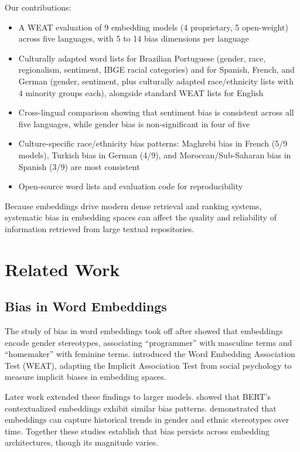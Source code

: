 \documentclass{sbc2019}
\begin{document}
Our contributions:
\begin{itemize}[nosep]
    \item A WEAT evaluation of 9 embedding models (4 proprietary, 5 open-weight) across five languages, with 5 to 14 bias dimensions per language
    \item Culturally adapted word lists for Brazilian Portuguese (gender, race, regionalism, sentiment, IBGE racial categories) and for Spanish, French, and German (gender, sentiment, plus culturally adapted race/ethnicity lists with 4 minority groups each), alongside standard WEAT lists for English
    \item Cross-lingual comparison showing that sentiment bias is consistent across all five languages, while gender bias is non-significant in four of five
    \item Culture-specific race/ethnicity bias patterns: Maghrebi bias in French (5/9 models), Turkish bias in German (4/9), and Moroccan/Sub-Saharan bias in Spanish (3/9) are most consistent
    \item Open-source word lists and evaluation code for reproducibility
\end{itemize}

Because embeddings drive modern dense retrieval and ranking systems, systematic bias in embedding spaces can affect the quality and reliability of information retrieved from large textual repositories.

\section{Related Work}

\subsection{Bias in Word Embeddings}

The study of bias in word embeddings took off after \cite{bolukbasi2016man} showed that embeddings encode gender stereotypes, associating ``programmer'' with masculine terms and ``homemaker'' with feminine terms. \cite{caliskan2017semantics} introduced the Word Embedding Association Test (WEAT), adapting the Implicit Association Test from social psychology to measure implicit biases in embedding spaces.

Later work extended these findings to larger models. \cite{ethayarajh2019contextual} showed that BERT's contextualized embeddings exhibit similar bias patterns. \cite{garg2018word} demonstrated that embeddings can capture historical trends in gender and ethnic stereotypes over time. Together these studies establish that bias persists across embedding architectures, though its magnitude varies.
\end{document}
